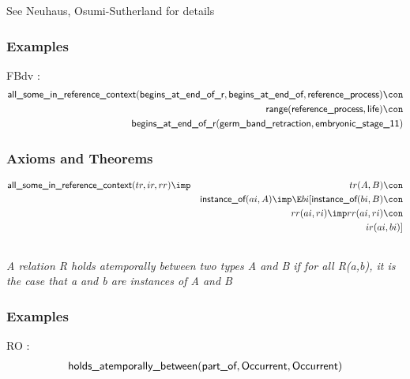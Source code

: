 See Neuhaus, Osumi-Sutherland for details

\subsubsection{Examples}
\begin{clist}
\item FBdv : \begin{eqnarray*}
 \pr{all\_some\_in\_reference\_context}( \pr{begins\_at\_end\_of\_r},  \pr{begins\_at\_end\_of},  \pr{reference\_process}) \con \\
 \pr{range}( \pr{reference\_process},  \pr{life}) \con \\
 \pr{begins\_at\_end\_of\_r}( \pr{germ\_band\_retraction},  \pr{embryonic\_stage\_11}) 
\end{eqnarray*}

\end{clist}

\subsubsection{Axioms and Theorems}


\begin{eqnarray*}
 \pr{all\_some\_in\_reference\_context}(tr, ir, rr) &\imp &tr(A, B) \con \\
&& \pr{instance\_of}(ai, A) \imp  \E bi[ \pr{instance\_of}(bi, B) \con \\
&&rr(ai, ri) \imp rr(ai, ri) \con \\
&&ir(ai, bi) ]
\end{eqnarray*}

\subsection{ }
\emph{A relation R holds atemporally between two types A and B if for all R(a,b), it is the case that a and b are instances of A and B}

\subsubsection{Examples}
\begin{clist}
\item RO : \begin{eqnarray*}
 \mbox{\sf holds\_atemporally\_between}( \mbox{\sf part\_of},  \mbox{\sf Occurrent},  \mbox{\sf Occurrent}) 
\end{eqnarray*}

\end{clist}

